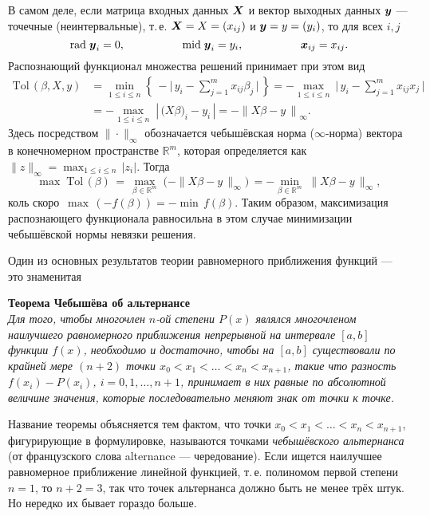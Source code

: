 \documentclass[a5paper,openany]{book}
\newcommand{\mbf}[1]{\protect\text{\boldmath$#1$}}
\newcommand{\mbb}{\mathbb}
\newcommand{\m}{\mathrm{mid}\;}
\newcommand{\Tol}{\mathrm{Tol}\,}
\renewcommand{\r}{\mathrm{rad}\;}
\begin{document}
В самом деле, если матрица входных данных $\mbf{X}$ и вектор выходных данных $\mbf{y}$ 
--- точечные (неинтервальные), т.\,е. $\mbf{X} = X = (x_{ij})$ и $\mbf{y} = y = (y_{i})$, 
то для всех $i, j$ 
\begin{equation*}
\r\mbf{y}_{i} = 0, \hspace{18mm} \m\mbf{y}_{i} = y_{i}, \hspace{18mm} \mbf{x}_{ij} = x_{ij}. 
\end{equation*}
Распознающий функционал множества решений принимает при этом вид 
\begin{align*}
\Tol(\beta, X,y) 
&= \min_{1\leq i\leq n}
  \left\{\, -\biggl|\,y_{i} - \sum_{j=1}^m x_{ij}\beta_j \,\biggr|\,\right\} 
 = -\max_{1\leq i\leq n} \  \biggl|\,y_{i} - \sum_{j=1}^m x_{ij}x_j \,\biggr| \\[3mm] 
&= -\max_{1\leq i\leq n} \;\left|\,\bigl(X\beta)_{i} - y_{i}\,\right| 
 = -\left\| X\beta - y\,\right\|_{\infty}. 
\end{align*} 
Здесь посредством $\|\cdot\|_\infty$ обозначается чебышёвская норма ($\infty$-норма) 
вектора в конечномерном пространстве $\mbb{R}^m$, которая определяется как 
$\|z\|_{\infty} = \max_{1\leq i\leq n}\,|z_{i}|$. Тогда 
\begin{equation*}
\max\;\Tol(\beta)\, = \,\max_{\beta\in\mbb{R}^m}\;\bigl(-\| X\beta - y\,\|_{\infty}\bigr)\, 
  = -\min_{\beta\in\mbb{R}^m}\; \| X\beta - y\,\|_{\infty}, 
\end{equation*} 
коль скоро $\,\max\,(-f(\beta)) = -\min\, f(\beta)$. 
Таким образом, максимизация распознающего функционала равносильна в этом случае 
минимизации чебышёвской нормы невязки решения. 
   
Один из основных результатов теории равномерного приближения функций --- это знаменитая 
  
\bigskip\noindent  
\textbf{Теорема Чебышёва об альтернансе} \cite{Bakhvalov,Natanson} \\  
{\sl Для того, чтобы многочлен $n$-ой степени $P(x)$ являлся многочленом наилучшего 
равномерного приближения непрерывной на интервале $[a, b]$ функции $f(x)$, необходимо 
и достаточно, чтобы на $[a, b]$ существовали по крайней мере $(n+2)$ точки $x_{0} 
< x_{1} < \ldots < x_{n} < x_{n+1}$, такие что разность $f(x_{i}) - P(x_{i})$, 
$i = 0, 1, \ldots, n+1$, принимает в них равные по абсолютной величине значения, 
которые последовательно меняют знак от точки к точке.}  
   
\bigskip    
Название теоремы объясняется тем фактом, что точки $x_{0} < x_{1} < \ldots < x_{n} 
< x_{n+1}$, фигурирующие в формулировке, называются точками \emph{чебышёвского 
альтернанса} (от французского слова alternance --- чередование). Если ищется наилучшее 
равномерное приближение линейной функцией, т.\,е. полиномом первой степени $n = 1$, 
то $n+2 = 3$, так что точек альтернанса должно быть не менее трёх штук.
 Но нередко их бывает гораздо больше. 
  
\end{document}
